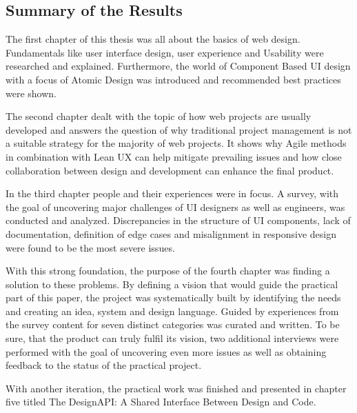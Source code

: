 \newpage
\subsection{Summary of the Results}
The first chapter of this thesis was all about the basics of web design. Fundamentals like user
interface design, user experience and Usability were researched and explained. Furthermore, the
world of Component Based UI design with a focus of Atomic Design was introduced and recommended best
practices were shown.

The second chapter dealt with the topic of how web projects are usually developed and answers the
question of why traditional project management is not a suitable strategy for the majority of
web projects. It shows why Agile methods in combination with Lean UX can help mitigate prevailing
issues and how close collaboration between design and development can enhance the final product. 

In the third chapter people and their experiences were in focus. A survey, with the goal of
uncovering major challenges of UI designers as well as engineers, was conducted and analyzed.
Discrepancies in the structure of UI components, lack of documentation, definition of edge cases and
misalignment in responsive design were found to be the most severe issues.

With this strong foundation, the purpose of the fourth chapter was finding a solution to these
problems. By defining a vision that would guide the practical part of this paper, the project was
systematically built by identifying the needs and creating an idea, system and design language.
Guided by experiences from the survey content for seven distinct categories was curated and written.
To be sure, that the product can truly fulfil its vision, two additional interviews were performed
with the goal of uncovering even more issues as well as obtaining feedback to the status of the
practical project. 

With another iteration, the practical work was finished and presented in chapter five titled The
DesignAPI: A Shared Interface Between Design and Code. 